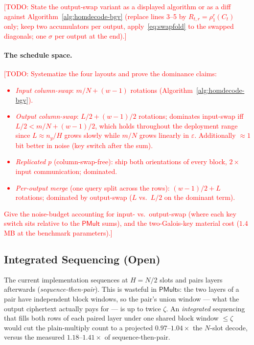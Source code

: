 \documentclass[runningheads]{llncs}
\newcommand{\TODO}[1]{\textcolor{red}{[TODO: #1]}}
\newcommand{\PMult}{\mathsf{PMult}}          %
\newcommand{\rr}{\rho}                       %
\newcommand{\colswap}{\sigma}                %
\newcommand{\band}{w}                        %
\newcommand{\eps}{\varepsilon}               %
\newcommand{\half}{H}                        %
\begin{document}
\TODO{State the output-swap variant as a displayed algorithm or as a diff against
Algorithm~\ref{alg:homdecode-bgv} (replace lines 3--5 by $R_{t,r}=\rr_1^r(C_t)$ only;
keep two accumulators per output, apply~\eqref{eq:swapfold} to the swapped diagonals;
one $\colswap$ per output at the end).}

\paragraph{The schedule space.}
\TODO{Systematize the four layouts and prove the dominance claims:
\begin{itemize}
  \item \emph{Input column-swap}: $m/N+(\band{-}1)$ rotations
  (Algorithm~\ref{alg:homdecode-bgv}).
  \item \emph{Output column-swap}: $L/2+(\band{-}1)/2$ rotations; dominates
  input-swap iff $L/2<m/N+(\band{-}1)/2$, which holds throughout the deployment
  range since $L\approx n_y/\half$ grows slowly while $m/N$ grows linearly in
  $\eps$. Additionally $\approx1$ bit better in noise (key switch after the sum).
  \item \emph{Replicated $p$} (column-swap-free): ship both orientations of every
  block, $2\times$ input communication; dominated.
  \item \emph{Per-output merge} (one query split across the rows): $(\band{-}1)/2+L$
  rotations; dominated by output-swap ($L$ vs.\ $L/2$ on the dominant term).
\end{itemize}
Give the noise-budget accounting for input- vs.\ output-swap (where each key switch
sits relative to the $\PMult$ sums), and the two-Galois-key material cost
($1.4$\,MB at the benchmark parameters).}

\subsection{Integrated Sequencing (Open)}
\label{sec:dense:intseq}

The current implementation sequences at $\half=N/2$ slots and pairs layers afterwards
(\emph{sequence-then-pair}). This is wasteful in $\PMult$s: the two layers of a pair
have independent block windows, so the pair's union window --- what the output
ciphertext actually pays for --- is up to twice $\zeta$. An \emph{integrated}
sequencing that fills both rows of each paired layer under one shared block window
$\le\zeta$ would cut the plain-multiply count to a projected $0.97$--$1.04\times$ the
$N$-slot decode, versus the measured $1.18$--$1.41\times$ of sequence-then-pair.
\end{document}
